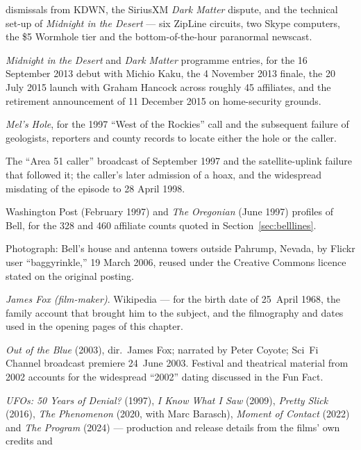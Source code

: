 \begin{srcnotes}
dismissals from KDWN, the SiriusXM \emph{Dark Matter} dispute, and the technical set-up of
\emph{Midnight in the Desert} --- six ZipLine circuits, two Skype computers, the \$5 Wormhole tier and
the bottom-of-the-hour paranormal newscast.
\item \emph{Midnight in the Desert} and \emph{Dark Matter} programme entries, for the 16 September 2013
debut with Michio Kaku, the 4 November 2013 finale, the 20 July 2015 launch with Graham Hancock across
roughly 45 affiliates, and the retirement announcement of 11 December 2015 on home-security grounds.
\item \emph{Mel's Hole}, for the 1997 ``West of the Rockies'' call and the subsequent failure of
geologists, reporters and county records to locate either the hole or the caller.
\item The ``Area 51 caller'' broadcast of September 1997 and the satellite-uplink failure that followed
it; the caller's later admission of a hoax, and the widespread misdating of the episode to 28 April 1998.
\item Washington Post (February 1997) and \emph{The Oregonian} (June 1997) profiles of Bell, for the 328
and 460 affiliate counts quoted in Section~\ref{sec:belllines}.
\item Photograph: Bell's house and antenna towers outside Pahrump, Nevada, by Flickr user
``baggyrinkle,'' 19 March 2006, reused under the Creative Commons licence stated on the original posting.
\item \emph{James Fox (film-maker)}. Wikipedia --- for the birth date of 25~April 1968, the family
account that brought him to the subject, and the filmography and dates used in the opening pages of
this chapter. 
\item \emph{Out of the Blue} (2003), dir.\ James Fox; narrated by Peter Coyote; Sci~Fi Channel
broadcast premiere 24~June 2003. Festival and theatrical material from 2002 accounts for the
widespread ``2002'' dating discussed in the Fun Fact.
\item \emph{UFOs: 50 Years of Denial?} (1997), \emph{I Know What I Saw} (2009), \emph{Pretty Slick}
(2016), \emph{The Phenomenon} (2020, with Marc Barasch), \emph{Moment of Contact} (2022) and
\emph{The Program} (2024) --- production and release details from the films' own credits and

\end{srcnotes}
